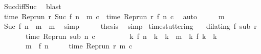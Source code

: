 \begin{isabellebody}
\ Suc{\isacharunderscore}diff{\isacharunderscore}Suc\ \isamarkupfalse%
\ blast\isanewline
\ \ \isamarkupfalse%
\ {\isacharasterisk}\ \isamarkupfalse%
\ {\isacartoucheopen}time\ {\isacharparenleft}{\isacharparenleft}Rep{\isacharunderscore}run\ r{\isacharparenright}\ {\isacharparenleft}Suc\ {\isacharparenleft}{\isacharparenleft}f\ n{\isacharparenright}\ {\isacharplus}\ m\ c{\isacharparenright}\ {\isacharequal}\ time\ {\isacharparenleft}{\isacharparenleft}Rep{\isacharunderscore}run\ r{\isacharparenright}\ {\isacharparenleft}f\ n{\isacharparenright}\ c{\isacharparenright}{\isacartoucheclose}\ \isamarkupfalse%
\ auto\isanewline
\ \ \isamarkupfalse%
\ \isamarkupfalse%
\ m{}\ \isamarkupfalse%
\ {\isacartoucheopen}Suc\ {\isacharparenleft}{\isacharparenleft}f\ n{\isacharparenright}\ {\isacharplus}\ m\ {\isacharequal}\ m{\isacartoucheclose}\ \isamarkupfalse%
\ simp\isanewline
\ \ \isamarkupfalse%
\ \isamarkupfalse%
\ {\isacharquery}thesis\ \isamarkupfalse%
\ simp\isanewline
{}\isamarkupfalse%
%
\endisatagproof
{\isafoldproof}%
%
\isadelimproof
\isanewline
%
\endisadelimproof
\isanewline
{}\isamarkupfalse%
\ time{\isacharunderscore}stuttering{\isacharcolon}\isanewline
\ \ \ {\isacartoucheopen}dilating\ f\ sub\ r{\isacartoucheclose}\isanewline
\ \ \ \ \ \ \ {\isacartoucheopen}time\ {\isacharparenleft}{\isacharparenleft}Rep{\isacharunderscore}run\ sub{\isacharparenright}\ n\ c{\isacharparenright}\ {\isacharequal}\ {\isasymtau}{\isacartoucheclose}\isanewline
\ \ \ \ \ \ \ {\isacartoucheopen}{\isasymAnd}k{\isachardot}\ f\ n\ {\isacharless}\ k\ {\isasymand}\ k\ {\isasymle}\ m\ {\isasymLongrightarrow}\ {\isacharparenleft}{\isasymnexists}k\ f\ k\ {\isacharequal}\ k{\isacharparenright}{\isacartoucheclose}\isanewline
\ \ \ \ \ \ \ {\isacartoucheopen}m\ {\isachargreater}\ f\ n{\isacartoucheclose}\isanewline
\ \ \ \ \ {\isacartoucheopen}time\ {\isacharparenleft}{\isacharparenleft}Rep{\isacharunderscore}run\ r{\isacharparenright}\ m\ c{\isacharparenright}\ {\isacharequal}\ {\isasymtau}{\isacartoucheclose}\isanewline
%
\isadelimproof
%
\endisadelimproof
%
\isatagproof
{}\isamarkupfalse%

\end{isabellebody}
